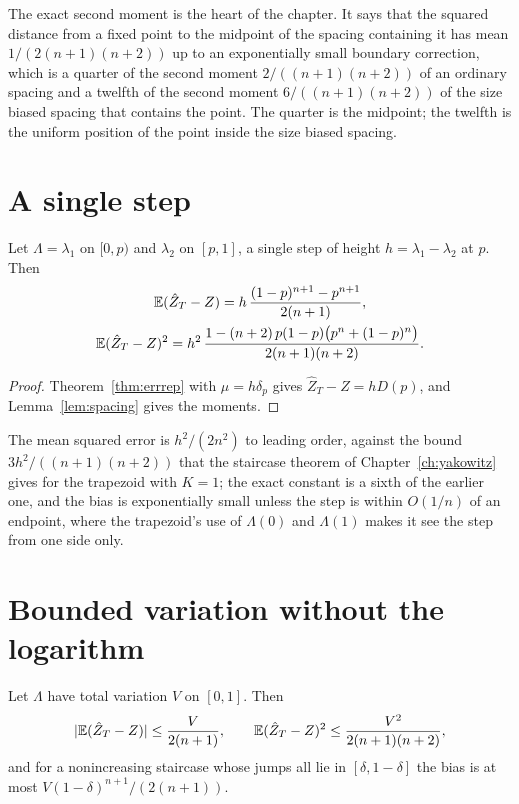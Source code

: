 The exact second moment is the heart of the chapter. It says that the squared distance from a fixed point to the midpoint of the spacing containing it has mean $1 / (2(n+1)(n+2))$ up to an exponentially small boundary correction, which is a quarter of the second moment $2/((n+1)(n+2))$ of an ordinary spacing and a twelfth of the second moment $6/((n+1)(n+2))$ of the size biased spacing that contains the point. The quarter is the midpoint; the twelfth is the uniform position of the point inside the size biased spacing.

\section{A single step}

\begin{theorem}
\label{thm:onestep}
Let $\Lambda = \lambda_1$ on $[0, p)$ and $\lambda_2$ on $[p, 1]$, a single step of height $h = \lambda_1 - \lambda_2$ at $p$. Then
\begin{gather*}
\mathbb{E} (\hat Z_T - Z) = h \, \frac{ (1-p)^{n+1} - p^{n+1} }{ 2 (n+1) } , \\
\mathbb{E} (\hat Z_T - Z)^2 = h^2 \, \frac{ 1 - (n+2) \, p (1-p) \big( p^n + (1-p)^n \big) }{ 2 (n+1)(n+2) } .
\end{gather*}
\end{theorem}

\begin{proof}
Theorem~\ref{thm:errrep} with $\mu = h \delta_p$ gives $\hat Z_T - Z = h D(p)$, and Lemma~\ref{lem:spacing} gives the moments.
\end{proof}

The mean squared error is $h^2 / (2 n^2)$ to leading order, against the bound $3 h^2 / ((n+1)(n+2))$ that the staircase theorem of Chapter~\ref{ch:yakowitz} gives for the trapezoid with $K = 1$; the exact constant is a sixth of the earlier one, and the bias is exponentially small unless the step is within $O(1/n)$ of an endpoint, where the trapezoid's use of $\Lambda(0)$ and $\Lambda(1)$ makes it see the step from one side only.

\section{Bounded variation without the logarithm}

\begin{theorem}
\label{thm:bv}
Let $\Lambda$ have total variation $V$ on $[0, 1]$. Then
\[
|\mathbb{E} (\hat Z_T - Z)| \le \frac{V}{2(n+1)} , \qquad
\mathbb{E} (\hat Z_T - Z)^2 \le \frac{ V^2 }{ 2 (n+1)(n+2) } ,
\]
and for a nonincreasing staircase whose jumps all lie in $[\delta, 1 - \delta]$ the bias is at most $V (1 - \delta)^{n+1} / (2(n+1))$.
\end{theorem}

